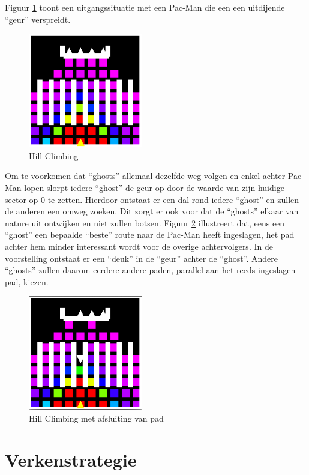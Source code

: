 \documentclass[12pt,a4paper]{report}
\begin{document}
Figuur \ref{fig:hillclimbing1} toont een uitgangssituatie met een Pac-Man die een een uitdijende ``geur'' verspreidt.

\begin{figure}[htbp]
  \centering
  \includegraphics[width=50mm]{resources/hillclimbing1.png}
  \caption{Hill Climbing}
  \label{fig:hillclimbing1}
\end{figure}

Om te voorkomen dat ``ghosts'' allemaal dezelfde weg volgen en enkel achter Pac-Man lopen slorpt iedere ``ghost'' de geur op door de waarde van zijn huidige sector op 0 te zetten. Hierdoor ontstaat er een dal rond iedere ``ghost'' en zullen de anderen een omweg zoeken. Dit zorgt er ook voor dat de ``ghosts'' elkaar van nature uit ontwijken en niet zullen botsen. Figuur \ref{fig:hillclimbing2} illustreert dat, eens een ``ghost'' een bepaalde ``beste'' route naar de Pac-Man heeft ingeslagen, het pad achter hem minder interessant wordt voor de overige achtervolgers. In de voorstelling ontstaat er een ``deuk'' in de ``geur'' achter de ``ghost''. Andere ``ghosts'' zullen daarom eerdere andere paden, parallel aan het reeds ingeslagen pad, kiezen.

\begin{figure}[htbp]
  \centering
  \includegraphics[width=50mm]{resources/hillclimbing2.png}
  \caption{Hill Climbing met afsluiting van pad}
  \label{fig:hillclimbing2}
\end{figure}

\section{Verkenstrategie}
\end{document}
